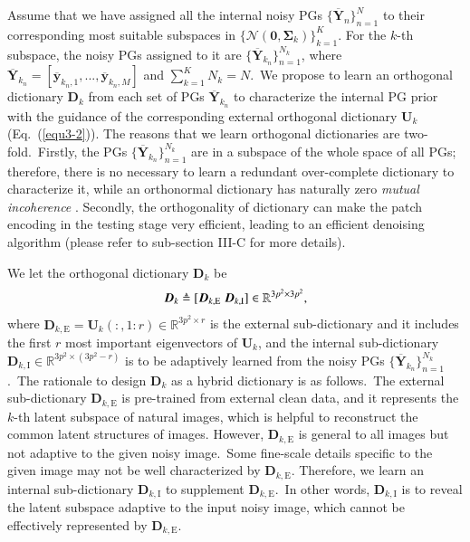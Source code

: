 Assume that we have assigned all the internal noisy PGs $\{\bm{\overline{Y}}_{n}\}_{n=1}^{N}$ to their corresponding most suitable subspaces in $\{\mathcal{N}(\bm{0},\bm{\Sigma}_{k})\}_{k=1}^{K}$. For the $k$-th subspace, the noisy PGs assigned to it are $\{\bm{\overline{Y}}_{k_{n}}\}_{n=1}^{N_{k}}$, where $\bm{\overline{Y}}_{k_{n}}=[\bm{\overline{y}}_{k_{n},1},...,\bm{\overline{y}}_{k_{n},M}]$ and $\sum_{k=1}^{K}N_{k}=N$.\ We propose to learn an orthogonal dictionary $\bm{D}_{k}$ from each set of PGs $\bm{\overline{Y}}_{k_{n}}$ to characterize the internal PG prior with the guidance of the corresponding external orthogonal dictionary $\bm{U}_{k}$ (Eq.\ (\ref{equ3-2})). The reasons that we learn orthogonal dictionaries are two-fold.\ Firstly, the PGs $\{\bm{\overline{Y}}_{k_{n}}\}_{n=1}^{N_{k}}$ are in a subspace of the whole space of all PGs; therefore, there is no necessary to learn a redundant over-complete dictionary to characterize it, while an orthonormal dictionary has naturally zero \emph{mutual incoherence} \cite{donoho2001uncertainty}. Secondly, the orthogonality of dictionary can make the patch encoding in the testing stage very efficient, leading to an efficient denoising algorithm (please refer to sub-section III-C for more details).

We let the orthogonal dictionary $\bm{D}_{k}$ be 
\vspace{-2mm}
\begin{equation}
\vspace{-2mm}
\label{equ3-4}
\bm{D}_{k}\triangleq[\bm{D}_{k,\text{E}}\ \bm{D}_{k,\text{I}}]\in \mathbb{R}^{3p^2\times 3p^2},
\end{equation}
where $\bm{D}_{k,\text{E}}=\bm{U}_{k}(:,1:r)\in\mathbb{R}^{3p^2\times r}$ is the external sub-dictionary and it includes the first $r$ most important eigenvectors of $\bm{U}_{k}$, and the internal sub-dictionary $\bm{D}_{k,\text{I}}\in\mathbb{R}^{3p^2\times (3p^2-r)}$ is to be adaptively learned from the noisy PGs $\{\bm{\overline{Y}}_{k_{n}}\}_{n=1}^{N_{k}}$.\ The rationale to design $\bm{D}_{k}$ as a hybrid dictionary is as follows.\ The external sub-dictionary $\bm{D}_{k,\text{E}}$ is pre-trained from external clean data, and it represents the $k$-th latent subspace of natural images, which is helpful to reconstruct the common latent structures of images. However, $\bm{D}_{k,\text{E}}$ is general to all images but not adaptive to the given noisy image.\ Some fine-scale details specific to the given image may not be well characterized by $\bm{D}_{k,\text{E}}$. Therefore, we learn an internal sub-dictionary $\bm{D}_{k,\text{I}}$ to supplement $\bm{D}_{k,\text{E}}$.\ In other words, $\bm{D}_{k,\text{I}}$ is to reveal the latent subspace adaptive to the input noisy image, which cannot be effectively represented by $\bm{D}_{k,\text{E}}$. 

